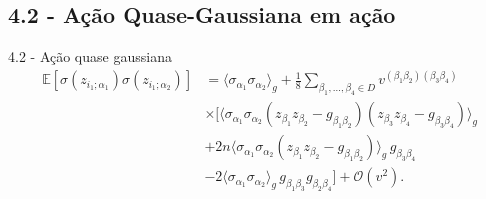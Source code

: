 \documentclass{beamer}
\begin{document}
\subsection{4.2 - Ação Quase-Gaussiana em ação}
\begin{frame}
\tableofcontents[currentsubsection]
\end{frame}

\begin{frame}{4.2 - Ação quase gaussiana}
\begin{align*}
    \mathbb{E} \left[ \sigma(z_{i_1;\alpha_1}) \sigma(z_{i_1;\alpha_2}) \right]
    &= \langle \sigma_{\alpha_1} \sigma_{\alpha_2} \rangle_g 
    + \frac{1}{8} \sum_{\beta_1,\dots,\beta_4 \in D} v^{(\beta_1 \beta_2)(\beta_3 \beta_4)} \\ 
    &\times[
    \langle \sigma_{\alpha_1} \sigma_{\alpha_2} (z_{\beta_1} z_{\beta_2} - g_{\beta_1 \beta_2})(z_{\beta_3} z_{\beta_4} - g_{\beta_3 \beta_4}) \rangle_g \\
    &+ 2n \langle \sigma_{\alpha_1} \sigma_{\alpha_2} (z_{\beta_1} z_{\beta_2} - g_{\beta_1 \beta_2}) \rangle_g \, g_{\beta_3 \beta_4} \\
    &- 2 \langle \sigma_{\alpha_1} \sigma_{\alpha_2} \rangle_g \, g_{\beta_1 \beta_3} g_{\beta_2 \beta_4}    
    ] + \mathcal{O}(v^2).
\end{align*}
\end{frame}
\end{document}
